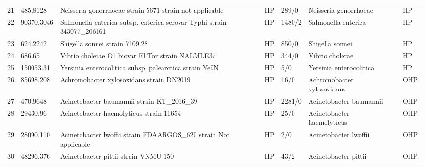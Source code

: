 \begin{longtable}{llllllll}
21  &      485.8128 &                  Neisseria gonorrhoeae strain 5671 strain not applicable &    HP &     289/0 &                          Neisseria gonorrhoeae &                                   \cite{quillin2018neisseria} &    HP \\
22  &    90370.3046 &  Salmonella enterica subsp. enterica serovar Typhi strain 343077\_206161 &    HP &    1480/2 &                            Salmonella enterica &                                   \cite{tanmoy2018salmonella} &    HP \\
23  &      624.2242 &                                           Shigella sonnei strain 7109.28 &    HP &     850/0 &                                Shigella sonnei &                                       \cite{shad2020shigella} &    HP \\
24  &        686.65 &                         Vibrio cholerae O1 biovar El Tor strain NALMLE37 &    HP &     344/0 &                                Vibrio cholerae &                                \cite{son2011characterization} &    HP \\
25  &     150053.31 &                   Yersinia enterocolitica subsp. palearctica strain Ye9N &    HP &       5/0 &                        Yersinia enterocolitica &                                     \cite{nieckarz2020urease} &    HP \\
26  &     85698.208 &                                 Achromobacter xylosoxidans strain DN2019 &    HP &      16/0 &                     Achromobacter xylosoxidans &                                   \cite{dai2015achromobacter} &   OHP \\
27  &      470.9648 &                              Acinetobacter baumannii strain KT\_2016\_39 &    HP &    2281/0 &                        Acinetobacter baumannii &                                \cite{howard2012acinetobacter} &   OHP \\
28  &      29430.96 &                                  Acinetobacter haemolyticus strain 11654 &    HP &      25/0 &                     Acinetobacter haemolyticus &                                   \cite{castro2020chromosome} &   OHP \\
29  &     28090.110 &         Acinetobacter lwoffii strain FDAARGOS\_620 strain Not applicable &    HP &       2/0 &                          Acinetobacter lwoffii &                              \cite{regalado2009acinetobacter} &   OHP \\
30  &     48296.376 &                                     Acinetobacter pittii strain VNMU 150 &    HP &      43/2 &                           Acinetobacter pittii &                                       \cite{espinal2012rapid} &   OHP \\

\end{longtable}
